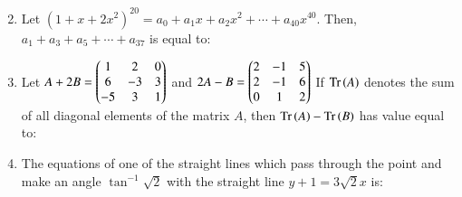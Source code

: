 \documentclass[journal,12pt,onecolumn]{IEEEtran}
\theoremstyle{remark}
\begin{document}
\begin{enumerate}
\begin{multicols}{2}
\end{multicols}


\item Let $(1 + x + 2x^2)^{20} = a_0 + a_1x + a_2x^2 + \cdots + a_{40}x^{40}$. Then, $a_1 + a_3 + a_5 + \cdots + a_{37}$ is equal to:

\begin{enumerate}
    
\end{enumerate}
   

\item Let $
A + 2B = \begin{pmatrix}1 & 2 & 0 \\
6 & -3 & 3 \\
-5 & 3 & 1 \end{pmatrix}$
 and 
  $2A - B = \begin{pmatrix}2 & -1 & 5 \\
2 & -1 & 6 \\
0 & 1 & 2\end{pmatrix}
$ If $\text{Tr}\left(A\right)$ denotes the sum of all diagonal elements of the matrix $A$, then $\text{Tr}\left(A\right) - \text{Tr}\left(B\right)$ has value equal to:

\begin{enumerate}
  
\end{enumerate}
\item The equations of one of the straight lines which pass through the point  and make an angle $\tan^{-1} \sqrt{2}$ with the straight line $y + 1 = 3\sqrt{2}x$ is:

\begin{enumerate}
    

\end{enumerate}
\end{enumerate}
\end{document}
